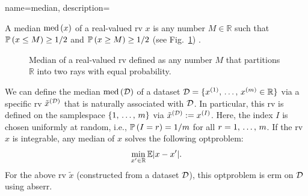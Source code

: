 {name={median},
	description={A median $\mathrm{med}\,(x)$ of a real-valued \gls{rv} $x$ 
 		is any number $M \in \mathbb{R}$ such that $\mathbb{P}\left( x \leq M\right) \geq 1/2$ and 
		$\mathbb{P}\left( x \geq M\right) \geq 1/2$ 
		(see Fig.\ \ref{fig_median1_dict}) \cite{LC}. 
 		\begin{figure}[H]
			\begin{center}
			\end{center}
		\caption{Median of a real-valued \gls{rv} defined as any number $M$ 
			that partitions $\mathbb{R}$ into two rays with equal \gls{probability}. \label{fig_median1_dict}}
 		\end{figure}  
 		We can define the median $\mathrm{med}\,(\mathcal{D})$ 
 		of a \gls{dataset} $\mathcal{D} = \{ x^{(1)}, \,\ldots, \,x^{(m)} \in \mathbb{R} \}$ 
 		via a specific \gls{rv} $\tilde{x}^{(\mathcal{D})}$ that is naturally associated with $\mathcal{D}$. 
 		In particular, this \gls{rv} is defined on the \gls{samplespace} $\{1, \,\ldots, \,m\}$ 
		via $\tilde{x}^{(\mathcal{D})} := x^{(I)}$. Here, the index $I$ is chosen uniformly 
		at random, i.e., $\mathbb{P}\left(I = r\right)=1/m$ for 
 		all $r=1, \,\ldots, \,m$. If the \gls{rv} $x$ is \gls{integrable}, any 
		median of $x$ solves the following \gls{optproblem}:
 		$$\min_{x' \in \mathbb{R}} \mathbb{E}{|x - x'|}.$$ 
		For the above \gls{rv} $\tilde{x}$ (constructed from a \gls{dataset} $\mathcal{D}$), 
		this \gls{optproblem} is \gls{erm} on $\mathcal{D}$ using \gls{abserr}. 
}}
